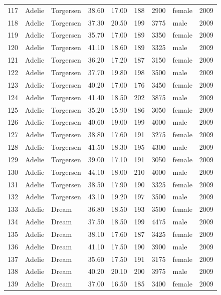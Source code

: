 \documentclass{article}\usepackage[]{graphicx}\usepackage[]{xcolor}
\begin{document}
\begin{table}[ht]
\begin{tabular}{rllrrrrlr}
  117 & Adelie & Torgersen & 38.60 & 17.00 & 188 & 2900 & female & 2009 \\ 
  118 & Adelie & Torgersen & 37.30 & 20.50 & 199 & 3775 & male & 2009 \\ 
  119 & Adelie & Torgersen & 35.70 & 17.00 & 189 & 3350 & female & 2009 \\ 
  120 & Adelie & Torgersen & 41.10 & 18.60 & 189 & 3325 & male & 2009 \\ 
  121 & Adelie & Torgersen & 36.20 & 17.20 & 187 & 3150 & female & 2009 \\ 
  122 & Adelie & Torgersen & 37.70 & 19.80 & 198 & 3500 & male & 2009 \\ 
  123 & Adelie & Torgersen & 40.20 & 17.00 & 176 & 3450 & female & 2009 \\ 
  124 & Adelie & Torgersen & 41.40 & 18.50 & 202 & 3875 & male & 2009 \\ 
  125 & Adelie & Torgersen & 35.20 & 15.90 & 186 & 3050 & female & 2009 \\ 
  126 & Adelie & Torgersen & 40.60 & 19.00 & 199 & 4000 & male & 2009 \\ 
  127 & Adelie & Torgersen & 38.80 & 17.60 & 191 & 3275 & female & 2009 \\ 
  128 & Adelie & Torgersen & 41.50 & 18.30 & 195 & 4300 & male & 2009 \\ 
  129 & Adelie & Torgersen & 39.00 & 17.10 & 191 & 3050 & female & 2009 \\ 
  130 & Adelie & Torgersen & 44.10 & 18.00 & 210 & 4000 & male & 2009 \\ 
  131 & Adelie & Torgersen & 38.50 & 17.90 & 190 & 3325 & female & 2009 \\ 
  132 & Adelie & Torgersen & 43.10 & 19.20 & 197 & 3500 & male & 2009 \\ 
  133 & Adelie & Dream & 36.80 & 18.50 & 193 & 3500 & female & 2009 \\ 
  134 & Adelie & Dream & 37.50 & 18.50 & 199 & 4475 & male & 2009 \\ 
  135 & Adelie & Dream & 38.10 & 17.60 & 187 & 3425 & female & 2009 \\ 
  136 & Adelie & Dream & 41.10 & 17.50 & 190 & 3900 & male & 2009 \\ 
  137 & Adelie & Dream & 35.60 & 17.50 & 191 & 3175 & female & 2009 \\ 
  138 & Adelie & Dream & 40.20 & 20.10 & 200 & 3975 & male & 2009 \\ 
  139 & Adelie & Dream & 37.00 & 16.50 & 185 & 3400 & female & 2009 \\ 

\end{tabular}
\end{table}
\end{document}
